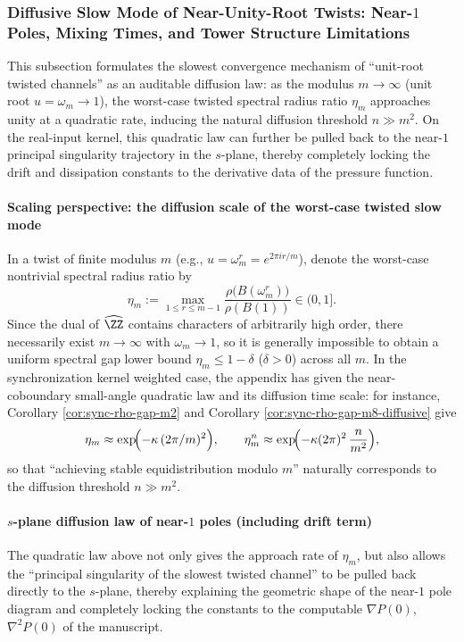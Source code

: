 \subsubsection{Diffusive Slow Mode of Near-Unity-Root Twists: Near-\texorpdfstring{$1$}{1} Poles, Mixing Times, and Tower Structure Limitations}\label{subsec:xi-near1-diffusive}
This subsection formulates the slowest convergence mechanism of ``unit-root twisted channels'' as an auditable diffusion law: as the modulus \(m\to\infty\) (unit root \(u=\omega_m\to 1\)), the worst-case twisted spectral radius ratio \(\eta_m\) approaches unity at a quadratic rate, inducing the natural diffusion threshold \(n\gg m^2\). On the real-input kernel, this quadratic law can further be pulled back to the near-\(1\) principal singularity trajectory in the \(s\)-plane, thereby completely locking the drift and dissipation constants to the derivative data of the pressure function.

\paragraph{Scaling perspective: the diffusion scale of the worst-case twisted slow mode}
In a twist of finite modulus \(m\) (e.g., \(u=\omega_m^r=e^{2\pi ir/m}\)), denote the worst-case nontrivial spectral radius ratio by
\[
\eta_m:=\max_{1\le r\le m-1}\frac{\rho\bigl(B(\omega_m^r)\bigr)}{\rho(B(1))}\in(0,1].
\]
Since the dual of \(\widehat{\ZZ}\) contains characters of arbitrarily high order, there necessarily exist \(m\to\infty\) with \(\omega_m\to 1\), so it is generally impossible to obtain a uniform spectral gap lower bound \(\eta_m\le 1-\delta\) (\(\delta>0\)) across all \(m\).
In the synchronization kernel weighted case, the appendix has given the near-coboundary small-angle quadratic law and its diffusion time scale: for instance, Corollary \ref{cor:sync-rho-gap-m2} and Corollary \ref{cor:sync-rho-gap-m8-diffusive} give
\[
\eta_m\approx \exp\!\Bigl(-\kappa\,(2\pi/m)^2\Bigr),
\qquad
\eta_m^n\approx \exp\!\Bigl(-\kappa(2\pi)^2\,\frac{n}{m^2}\Bigr),
\]
so that ``achieving stable equidistribution modulo \(m\)'' naturally corresponds to the diffusion threshold \(n\gg m^2\).

\paragraph{\texorpdfstring{$s$}{s}-plane diffusion law of near-\texorpdfstring{$1$}{1} poles (including drift term)}
The quadratic law above not only gives the approach rate of \(\eta_m\), but also allows the ``principal singularity of the slowest twisted channel'' to be pulled back directly to the
\(s\)-plane, thereby explaining the geometric shape of the near-\(1\) pole diagram and completely locking the constants to the computable
\(\nabla P(0)\), \(\nabla^2P(0)\) of the manuscript.

